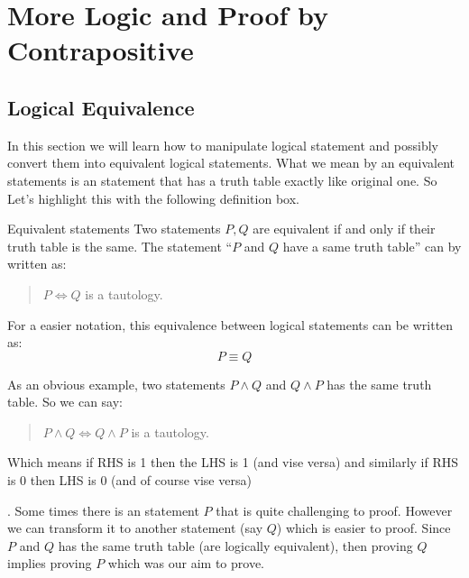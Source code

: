 \section{More Logic and Proof by Contrapositive}  

\subsection{Logical Equivalence}

In this section we will learn how to manipulate logical statement and possibly convert them into equivalent logical statements. What we mean by an equivalent statements is an statement that has a truth table exactly like original one. So Let's highlight this with the following definition box.

\begin{defbox}{Equivalent statements}
	Two statements $ P,Q $ are equivalent if and only if their truth table is the same. The statement ``$ P $ and $ Q $ have a same truth table'' can by written as:
	\begin{quote}
		\centering
		$ P \Leftrightarrow Q $ is a tautology.
	\end{quote}
	For a easier notation, this equivalence between logical statements can be written as:
	\[ P \equiv Q \]
\end{defbox} 

As an obvious example, two statements $ P \wedge Q $ and $ Q \wedge P $ has the same truth table. So we can say:
\begin{quote}
	\centering
	$P \wedge Q \Leftrightarrow Q \wedge P$ is a tautology.
\end{quote}

Which means if RHS is 1 then the LHS is 1 (and vise versa) and similarly if RHS is 0 then LHS is 0 (and of course vise versa)

. Some times there is an statement $ P $ that is quite challenging to proof. However we can transform it to another statement (say $ Q $) which is easier to proof. Since $ P $ and $ Q $ has the same truth table (are logically equivalent), then proving $ Q $ implies proving $ P $ which was our aim to prove.

